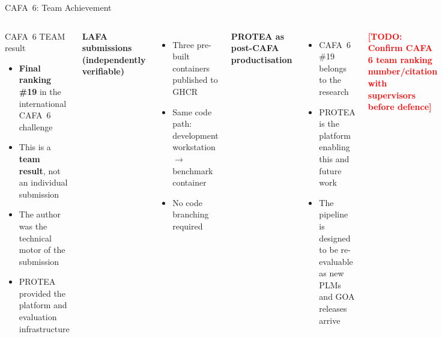 \documentclass[12pt, aspectratio=169]{beamer}
\newcommand{\highlight}[1]{\textcolor{proteagreen}{\textbf{#1}}}
\newcommand{\todo}[1]{\textcolor{red}{\textbf{[TODO: #1]}}}
\begin{document}
\begin{frame}{CAFA~6: Team Achievement}
  \begin{columns}[c]
      \begin{block}{CAFA~6 TEAM result}
        \begin{itemize}
          \item \highlight{Final ranking \#19} in the international CAFA~6 challenge
          \item This is a \textbf{team result}, not an individual submission
          \item The author was the technical motor of the submission
          \item PROTEA provided the platform and evaluation infrastructure
        \end{itemize}
      \end{block}
      \vspace{0.5em}
      \textbf{LAFA submissions (independently verifiable)}
      \begin{itemize}
        \item Three pre-built containers published to GHCR
        \item Same code path: development workstation $\to$ benchmark container
        \item No code branching required
      \end{itemize}
      \textbf{PROTEA as post-CAFA productisation}
      \begin{itemize}
        \item CAFA~6 \#19 belongs to the research
        \item PROTEA is the platform enabling this and future work
        \item The pipeline is designed to be re-evaluable as new PLMs and GOA releases arrive
      \end{itemize}
      \vspace{0.5em}
      \todo{Confirm CAFA 6 team ranking number/citation with supervisors before defence}
  \end{columns}
\end{frame}
\end{document}
